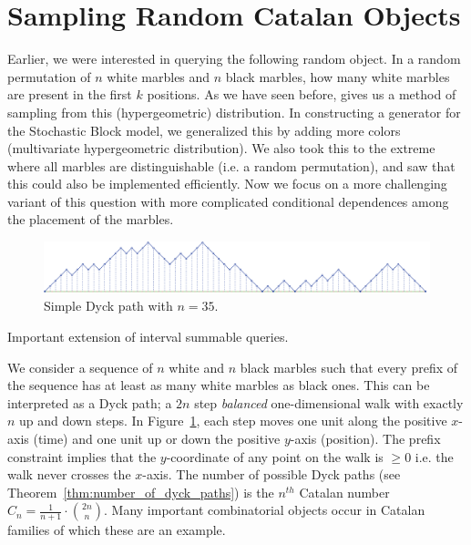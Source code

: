\section{Sampling Random Catalan Objects}%
\label{sec:catalan_objects}

Earlier, we were interested in querying the following random object.
In a random permutation of $n$ white marbles and $n$ black marbles, how many white marbles are present in the first $k$ positions.
As we have seen before,  \cite{huge} gives us a method of sampling from this (hypergeometric) distribution.
In constructing a generator for the Stochastic Block model, we generalized this by adding more colors (multivariate hypergeometric distribution).
We also took this to the extreme where all marbles are distinguishable (i.e. a random permutation),
and saw that this could also be implemented efficiently.
Now we focus on a more challenging variant of this question with more complicated conditional dependences among the placement of the marbles.

\begin{figure}[htbp]
    \centering
    \includegraphics[width=\textwidth]{images/basic_dyck_path.pdf}
    \caption{Simple Dyck path with $n = 35$.}
    \label{fig:basic_dyck}
\end{figure}
Important extension of interval summable queries.

We consider a sequence of $n$ white and $n$ black marbles such that every prefix of the sequence has at least as many white marbles as black ones.
This can be interpreted as a Dyck path; a $2n$ step \emph{balanced} one-dimensional walk with exactly $n$ up and down steps.
In Figure~\ref{fig:basic_dyck}, each step moves one unit along the positive $x$-axis (time) and one unit up or down the positive $y$-axis (position).
The prefix constraint implies that the $y$-coordinate of any point on the walk is $\ge 0$ i.e. the walk never crosses the $x$-axis.
The number of possible Dyck paths (see Theorem~\ref{thm:number_of_dyck_paths}) is the $n^{th}$ Catalan number $C_n=\frac{1}{n+1}\cdot{2n\choose n}$.
Many important combinatorial objects occur in Catalan families of which these are an example.

